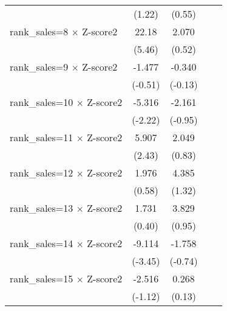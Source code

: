 {\begin{tabular}{l*{4}{c}}
                    &      (1.22)         &      (0.55)         &                     &                     \\
rank\_sales=8 $\times$ Z-score2&       22.18\sym{***}&       2.070         &                     &                     \\
                    &      (5.46)         &      (0.52)         &                     &                     \\
rank\_sales=9 $\times$ Z-score2&      -1.477         &      -0.340         &                     &                     \\
                    &     (-0.51)         &     (-0.13)         &                     &                     \\
rank\_sales=10 $\times$ Z-score2&      -5.316\sym{*}  &      -2.161         &                     &                     \\
                    &     (-2.22)         &     (-0.95)         &                     &                     \\
rank\_sales=11 $\times$ Z-score2&       5.907\sym{*}  &       2.049         &                     &                     \\
                    &      (2.43)         &      (0.83)         &                     &                     \\
rank\_sales=12 $\times$ Z-score2&       1.976         &       4.385         &                     &                     \\
                    &      (0.58)         &      (1.32)         &                     &                     \\
rank\_sales=13 $\times$ Z-score2&       1.731         &       3.829         &                     &                     \\
                    &      (0.40)         &      (0.95)         &                     &                     \\
rank\_sales=14 $\times$ Z-score2&      -9.114\sym{***}&      -1.758         &                     &                     \\
                    &     (-3.45)         &     (-0.74)         &                     &                     \\
rank\_sales=15 $\times$ Z-score2&      -2.516         &       0.268         &                     &                     \\
                    &     (-1.12)         &      (0.13)         &                     &                     \\

\end{tabular}}
